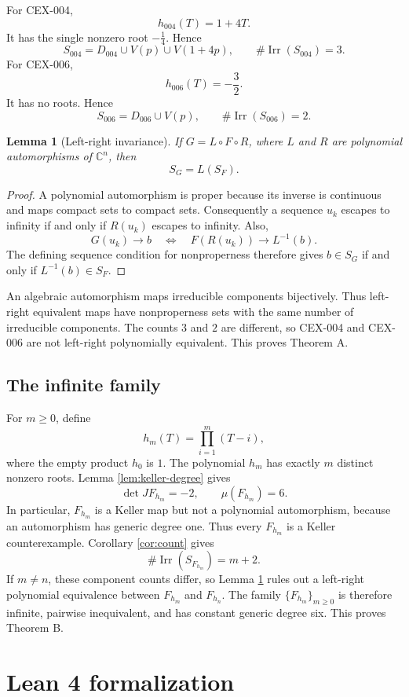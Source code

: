 \documentclass[11pt]{article}
\newtheorem{lemma}[theorem]{Lemma}
\newcommand{\C}{\mathbb{C}}
\newcommand{\Irr}{\operatorname{Irr}}
\begin{document}
For CEX-004,
\[
 h_{004}(T)=1+4T.
\]
It has the single nonzero root $-\frac14$.  Hence
\[
 S_{004}=D_{004}\cup V(p)\cup V(1+4p),
 \qquad
 \#\Irr(S_{004})=3.
\]
For CEX-006,
\[
 h_{006}(T)=-\frac32.
\]
It has no roots.  Hence
\[
 S_{006}=D_{006}\cup V(p),
 \qquad
 \#\Irr(S_{006})=2.
\]

\begin{lemma}[Left-right invariance]
\label{lem:invariance}
If $G=L\circ F\circ R$, where $L$ and $R$ are polynomial automorphisms of
$\C^n$, then
\[
 S_G=L(S_F).
\]
\end{lemma}

\begin{proof}
A polynomial automorphism is proper because its inverse is continuous and
maps compact sets to compact sets.  Consequently a sequence $u_k$ escapes to
infinity if and only if $R(u_k)$ escapes to infinity.  Also,
\[
 G(u_k)\to b
 \quad\Longleftrightarrow\quad
 F(R(u_k))\to L^{-1}(b).
\]
The defining sequence condition for nonproperness therefore gives
$b\in S_G$ if and only if $L^{-1}(b)\in S_F$.
\end{proof}

An algebraic automorphism maps irreducible components bijectively.  Thus
left-right equivalent maps have nonproperness sets with the same number of
irreducible components.  The counts $3$ and $2$ are different, so CEX-004
and CEX-006 are not left-right polynomially equivalent.  This proves
Theorem A.

\subsection{The infinite family}

For $m\ge0$, define
\[
 h_m(T)=\prod_{i=1}^{m}(T-i),
\]
where the empty product $h_0$ is $1$.  The polynomial $h_m$ has exactly $m$
distinct nonzero roots.  Lemma \ref{lem:keller-degree} gives
\[
 \det JF_{h_m}=-2,
 \qquad
 \mu(F_{h_m})=6.
\]
In particular, $F_{h_m}$ is a Keller map but not a polynomial automorphism,
because an automorphism has generic degree one.  Thus every $F_{h_m}$ is a
Keller counterexample.  Corollary \ref{cor:count} gives
\[
 \#\Irr(S_{F_{h_m}})=m+2.
\]
If $m\ne n$, these component counts differ, so Lemma \ref{lem:invariance}
rules out a left-right polynomial equivalence between $F_{h_m}$ and
$F_{h_n}$.  The family $\{F_{h_m}\}_{m\ge0}$ is therefore infinite, pairwise
inequivalent, and has constant generic degree six.  This proves Theorem B.

\section{Lean 4 formalization}
\end{document}
